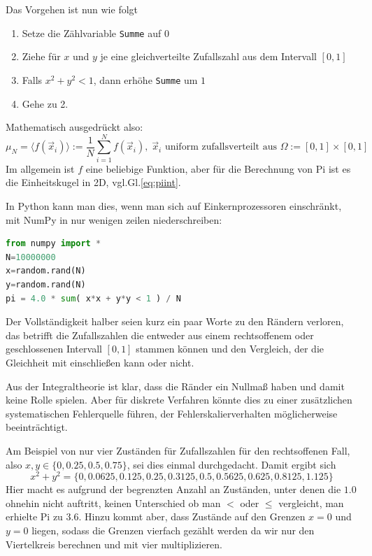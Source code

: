 \documentclass[german,bibnum,beleg,zihtitle,german,hyperref,utf8]{zihpub}
\begin{document}
Das Vorgehen ist nun wie folgt
\begin{enumerate}
	\item Setze die Zählvariable \texttt{Summe} auf $0$
	\item Ziehe für $x$ und $y$ je eine gleichverteilte Zufallszahl aus dem Intervall $[0,1]$\ 
	\item Falls $x^2+y^2<1$, dann erhöhe \texttt{Summe} um $1$
	\item Gehe zu 2.
\end{enumerate}
Mathematisch ausgedrückt also:
\begin{equation}
	\label{eq:pimonteint}
	\mu_N = \langle f\left( \vec{x}_i \right) \rangle := \frac{1}{N} \sum_{i=1}^N f\left( \vec{x}_i \right),\;\vec{x}_i \text{ uniform zufallsverteilt aus } \Omega:=[0,1]\times[0,1]
\end{equation}
Im allgemein ist $f$ eine beliebige Funktion, aber für die Berechnung von Pi ist es die Einheitskugel in 2D, vgl.Gl.\ref{eq:piint}.

In Python kann man dies, wenn man sich auf Einkernprozessoren einschränkt, mit NumPy\cite{numpy} in nur wenigen zeilen niederschreiben:
\begin{lstlisting}[language=python]
from numpy import *
N=10000000
x=random.rand(N)
y=random.rand(N)
pi = 4.0 * sum( x*x + y*y < 1 ) / N
\end{lstlisting}\vspace{-1.5\baselineskip}

Der Vollständigkeit halber seien kurz ein paar Worte zu den Rändern verloren, das betrifft die Zufallszahlen die entweder aus einem rechtsoffenem oder geschlossenen Intervall $[0,1]$ stammen können und den Vergleich, der die Gleichheit mit einschließen kann oder nicht.

Aus der Integraltheorie ist klar, dass die Ränder ein Nullmaß haben und damit keine Rolle spielen. Aber für diskrete Verfahren könnte dies zu einer zusätzlichen systematischen Fehlerquelle führen, der Fehlerskalierverhalten möglicherweise beeinträchtigt.

Am Beispiel von nur vier Zuständen für Zufallszahlen für den rechtsoffenen Fall, also $x,y\in \lbrace 0,0.25,0.5,0.75 \rbrace$, sei dies einmal durchgedacht. Damit ergibt sich
\begin{equation}
	x^2+y^2 = \lbrace 0, 0.0625, 0.125, 0.25, 0.3125, 0.5, 0.5625, 0.625, 0.8125, 1.125 \rbrace
\end{equation}
Hier macht es aufgrund der begrenzten Anzahl an Zuständen, unter denen die $1.0$ ohnehin nicht auftritt, keinen Unterschied ob man $<$ oder $\leq$ vergleicht, man erhielte Pi zu $3.6$.
Hinzu kommt aber, dass Zustände auf den Grenzen $x=0$ und $y=0$ liegen, sodass die Grenzen vierfach gezählt werden da wir nur den Viertelkreis berechnen und mit vier multiplizieren. 
\end{document}
